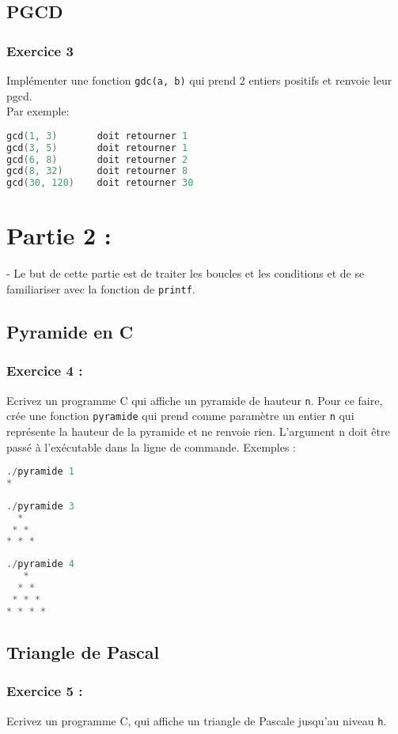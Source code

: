\documentclass[a4paper]{article}
\begin{document}
	\subsection*{PGCD}
	\subsubsection*{Exercice 3}
	Implémenter une fonction \texttt{gdc(a, b)} qui prend 2 entiers positifs et renvoie leur pgcd. \\
	Par exemple:
	\begin{lstlisting}[language=C]
gcd(1, 3) 		doit retourner 1
gcd(3, 5) 		doit retourner 1
gcd(6, 8) 		doit retourner 2
gcd(8, 32) 		doit retourner 8
gcd(30, 120) 	doit retourner 30
	\end{lstlisting}
	
	\section*{Partie 2 : }
	- Le but de cette partie est de traiter les boucles et les conditions et de se familiariser avec la fonction de \texttt{printf}.\\
	\subsection*{Pyramide en C}
	\subsubsection*{Exercice 4 : }
	Ecrivez un programme C qui affiche un pyramide de hauteur \texttt{n}. Pour ce faire, crée une fonction \texttt{pyramide} qui prend comme paramètre un entier \texttt{n} qui représente la hauteur de la pyramide et ne renvoie rien. L'argument n doit être passé à l'exécutable dans la ligne de commande.
	Exemples : \\
\begin{lstlisting}[language=C]
./pyramide 1
*
\end{lstlisting}
\begin{lstlisting}[language=C]
./pyramide 3
  *
 * *
* * *
\end{lstlisting}
\begin{lstlisting}[language=C]	
./pyramide 4
   *
  * *
 * * *
* * * *
\end{lstlisting}
	\subsection*{Triangle de Pascal}
	\subsubsection*{Exercice 5 : }
	Ecrivez un programme C, qui affiche un triangle de Pascale jusqu'au niveau \texttt{h}.
	
\end{document}
